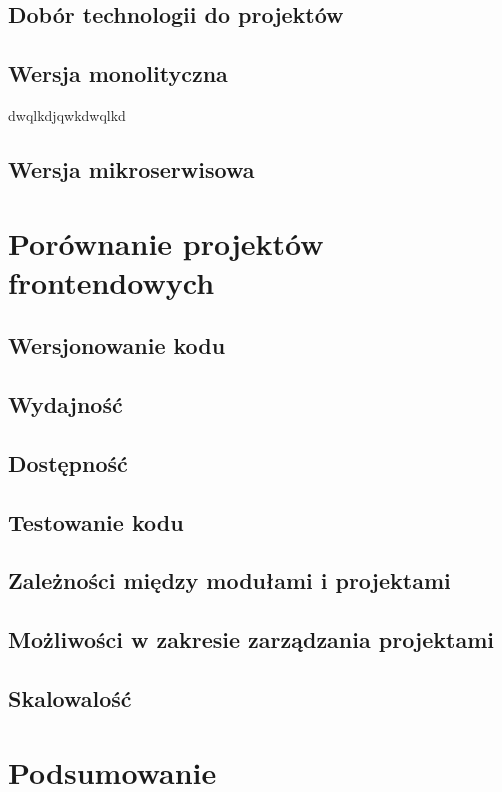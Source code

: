 \documentclass{SGGW-thesis}
\begin{document}
  \section{Dobór technologii do projektów}
  \section{Wersja monolityczna}
    dwqlkdjqwkdwqlkd\cite{fowler_2019}
  \section{Wersja mikroserwisowa}

\chapter{Porównanie projektów frontendowych}
  \section{Wersjonowanie kodu}
  \section{Wydajność}
  \section{Dostępność}
  \section{Testowanie kodu}
  \section{Zależności między modułami i projektami}
  \section{Możliwości w zakresie zarządzania projektami}
  \section{Skalowalość}

\chapter{Podsumowanie}

\nocite{*}



\beforelastpage
\end{document}
